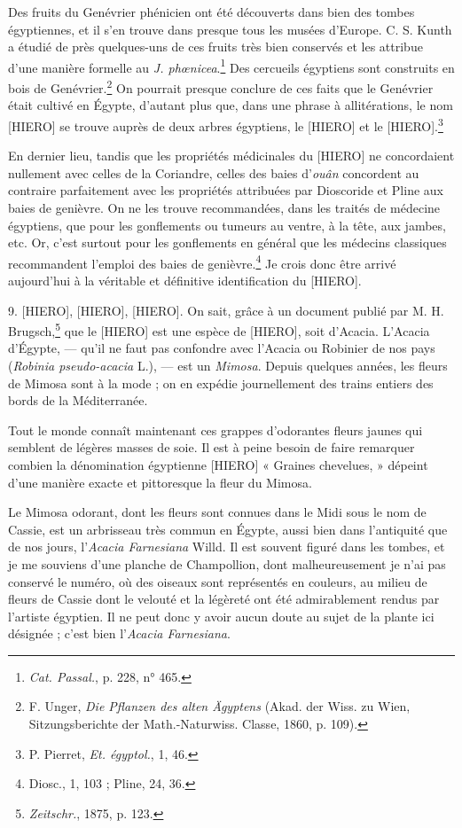 \documentclass[a4paper, 11pt, oneside, landscape]{article}
\begin{document}
Des fruits du Genévrier phénicien ont été découverts dans bien des tombes égyptiennes, et il s'en trouve dans presque tous les musées d'Europe. C. S. Kunth a étudié de près quelques-uns de ces fruits très bien conservés et les attribue d'une manière formelle au \emph{J. phœnicea}.\footnote{\emph{Cat. Passal.}, p. 228, n° 465.} Des cercueils égyptiens sont construits en bois de Genévrier.\footnote{F. Unger, \emph{Die Pflanzen des alten Ägyptens} (Akad. der Wiss. zu Wien, Sitzungsberichte der Math.-Naturwiss. Classe, 1860, p. 109).} On pourrait presque conclure de ces faits que le Genévrier était cultivé en Égypte, d'autant plus que, dans une phrase à allitérations, le nom [HIERO] se trouve auprès de deux arbres égyptiens, le [HIERO] et le [HIERO].\footnote{P. Pierret, \emph{Et. égyptol.}, 1, 46.}

En dernier lieu, tandis que les propriétés médicinales du [HIERO] ne concordaient nullement avec celles de la Coriandre, celles des baies d'\emph{ouân} concordent au contraire parfaitement avec les propriétés attribuées par Dioscoride et Pline aux baies de genièvre. On ne les trouve recommandées, dans les traités de médecine égyptiens, que pour les gonflements ou tumeurs au ventre, à la tête, aux jambes, etc. Or, c'est surtout pour les gonflements en général que les médecins classiques recommandent l'emploi des baies de genièvre.\footnote{Diosc., 1, 103 ; Pline, 24, 36.} Je crois donc être arrivé aujourd'hui à la véritable et définitive identification du [HIERO].

9. [HIERO], [HIERO], [HIERO]. On sait, grâce à un document publié par M. H. Brugsch,\footnote{\emph{Zeitschr.}, 1875, p. 123.} que le [HIERO] est une espèce de [HIERO], soit d'Acacia. L'Acacia d'Égypte, --- qu'il ne faut pas confondre avec l'Acacia ou Robinier de nos pays (\emph{Robinia pseudo-acacia} L.), --- est un \emph{Mimosa}. Depuis quelques années, les fleurs de Mimosa sont à la mode ; on en expédie journellement des trains entiers des bords de la Méditerranée.

Tout le monde connaît maintenant ces grappes d'odorantes fleurs jaunes qui semblent de légères masses de soie. Il est à peine besoin de faire remarquer combien la dénomination égyptienne [HIERO] « Graines chevelues, » dépeint d'une manière exacte et pittoresque la fleur du Mimosa.

Le Mimosa odorant, dont les fleurs sont connues dans le Midi sous le nom de Cassie, est un arbrisseau très commun en Égypte, aussi bien dans l'antiquité que de nos jours, l'\emph{Acacia Farnesiana} Willd. Il est souvent figuré dans les tombes, et je me souviens d'une planche de Champollion, dont malheureusement je n'ai pas conservé le numéro, où des oiseaux sont représentés en couleurs, au milieu de fleurs de Cassie dont le velouté et la légèreté ont été admirablement rendus par l'artiste égyptien. Il ne peut donc y avoir aucun doute au sujet de la plante ici désignée ; c'est bien l'\emph{Acacia Farnesiana}.
\end{document}

